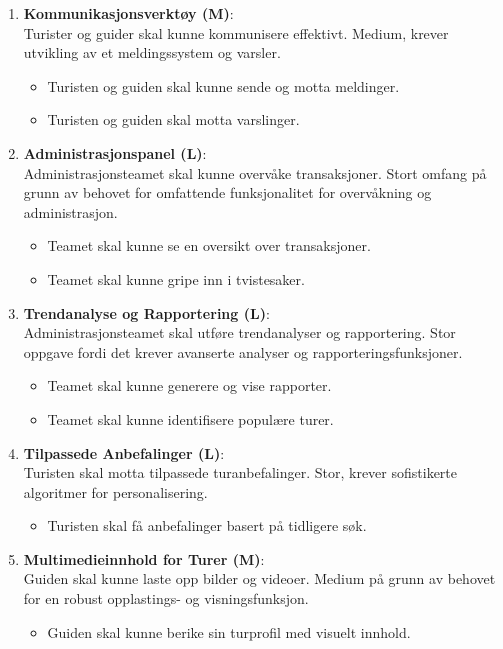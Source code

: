 \documentclass[../doc.tex]{subfiles}
\begin{document}
\begin{enumerate}
    \item \textbf{Kommunikasjonsverktøy (M)}: \\
    Turister og guider skal kunne kommunisere effektivt. Medium, krever utvikling av et meldingssystem og varsler.
    \begin{itemize}
        \item Turisten og guiden skal kunne sende og motta meldinger.
        \item Turisten og guiden skal motta varslinger.
    \end{itemize}

    \item \textbf{Administrasjonspanel (L)}: \\
    Administrasjonsteamet skal kunne overvåke transaksjoner. Stort omfang på grunn av behovet for omfattende funksjonalitet for overvåkning og administrasjon.
    \begin{itemize}
        \item Teamet skal kunne se en oversikt over transaksjoner.
        \item Teamet skal kunne gripe inn i tvistesaker.
    \end{itemize}

    \item \textbf{Trendanalyse og Rapportering (L)}: \\
    Administrasjonsteamet skal utføre trendanalyser og rapportering. Stor oppgave fordi det krever avanserte analyser og rapporteringsfunksjoner.
    \begin{itemize}
        \item Teamet skal kunne generere og vise rapporter.
        \item Teamet skal kunne identifisere populære turer.
    \end{itemize}

    \item \textbf{Tilpassede Anbefalinger (L)}: \\
    Turisten skal motta tilpassede turanbefalinger. Stor, krever sofistikerte algoritmer for personalisering.
    \begin{itemize}
        \item Turisten skal få anbefalinger basert på tidligere søk.
    \end{itemize}

    \item \textbf{Multimedieinnhold for Turer (M)}: \\
    Guiden skal kunne laste opp bilder og videoer. Medium på grunn av behovet for en robust opplastings- og visningsfunksjon.
    \begin{itemize}
        \item Guiden skal kunne berike sin turprofil med visuelt innhold.
    \end{itemize}


\end{enumerate}
\end{document}
